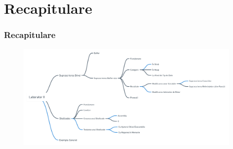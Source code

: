 \documentclass[xcolor={table}]{beamer}
\begin{document}
	\section{Recapitulare}

	\begin{frame}
		\frametitle{Recapitulare}\pause
		\begin{figure}
            \centering
            \includegraphics[width=11cm]{images/recap.png}
        \end{figure}
	\end{frame}
\end{document}

